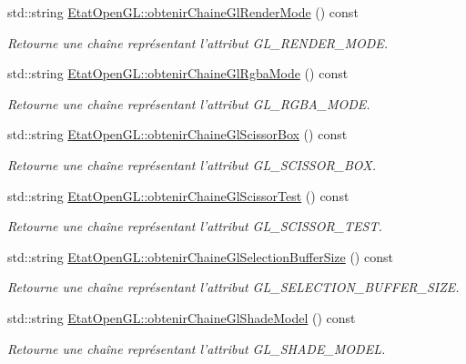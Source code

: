 \begin{DoxyCompactItemize}
std\-::string \hyperlink{group__utilitaire_ga64d9bf10216007aeb301d43ac14f82b4}{Etat\-Open\-G\-L\-::obtenir\-Chaine\-Gl\-Render\-Mode} () const 
\begin{DoxyCompactList}\small\item\em Retourne une chaîne représentant l'attribut G\-L\-\_\-\-R\-E\-N\-D\-E\-R\-\_\-\-M\-O\-D\-E. \end{DoxyCompactList}\item 
std\-::string \hyperlink{group__utilitaire_ga1596849dfe7b4606e0fc3ff9fbe00489}{Etat\-Open\-G\-L\-::obtenir\-Chaine\-Gl\-Rgba\-Mode} () const 
\begin{DoxyCompactList}\small\item\em Retourne une chaîne représentant l'attribut G\-L\-\_\-\-R\-G\-B\-A\-\_\-\-M\-O\-D\-E. \end{DoxyCompactList}\item 
std\-::string \hyperlink{group__utilitaire_ga58f683f150a231ec839aed3f79cd3ef2}{Etat\-Open\-G\-L\-::obtenir\-Chaine\-Gl\-Scissor\-Box} () const 
\begin{DoxyCompactList}\small\item\em Retourne une chaîne représentant l'attribut G\-L\-\_\-\-S\-C\-I\-S\-S\-O\-R\-\_\-\-B\-O\-X. \end{DoxyCompactList}\item 
std\-::string \hyperlink{group__utilitaire_ga80ed5d63c763521b6db8166033008a6a}{Etat\-Open\-G\-L\-::obtenir\-Chaine\-Gl\-Scissor\-Test} () const 
\begin{DoxyCompactList}\small\item\em Retourne une chaîne représentant l'attribut G\-L\-\_\-\-S\-C\-I\-S\-S\-O\-R\-\_\-\-T\-E\-S\-T. \end{DoxyCompactList}\item 
std\-::string \hyperlink{group__utilitaire_gae47f276d2d1d8233f544fca09b062e63}{Etat\-Open\-G\-L\-::obtenir\-Chaine\-Gl\-Selection\-Buffer\-Size} () const 
\begin{DoxyCompactList}\small\item\em Retourne une chaîne représentant l'attribut G\-L\-\_\-\-S\-E\-L\-E\-C\-T\-I\-O\-N\-\_\-\-B\-U\-F\-F\-E\-R\-\_\-\-S\-I\-Z\-E. \end{DoxyCompactList}\item 
std\-::string \hyperlink{group__utilitaire_gaef3c863fd714bcd6607a7fe129c6c1d4}{Etat\-Open\-G\-L\-::obtenir\-Chaine\-Gl\-Shade\-Model} () const 
\begin{DoxyCompactList}\small\item\em Retourne une chaîne représentant l'attribut G\-L\-\_\-\-S\-H\-A\-D\-E\-\_\-\-M\-O\-D\-E\-L. \end{DoxyCompactList}\item 

\end{DoxyCompactItemize}
